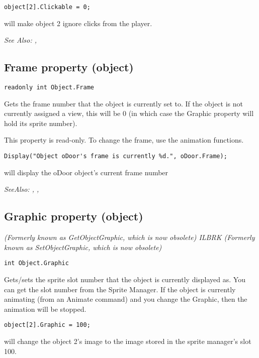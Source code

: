 \begin{verbatim}
object[2].Clickable = 0;
\end{verbatim}
will make object 2 ignore clicks from the player.

\it{See Also:} ,


\subsection{Frame property (object)}\label{Object.Frame}%

\begin{verbatim}
readonly int Object.Frame
\end{verbatim}
Gets the frame number that the object is currently set to. If the object is not currently
assigned a view, this will be 0 (in which case the Graphic property will
hold its sprite number).

This property is read-only. To change the frame, use the animation functions.

\begin{verbatim}
Display("Object oDoor's frame is currently %d.", oDoor.Frame);
\end{verbatim}
will display the oDoor object's current frame number

\it{SeeAlso:} ,
,


\subsection{Graphic property (object)}\label{Object.Graphic}%

\it{(Formerly known as GetObjectGraphic, which is now obsolete)} ILBRK
\it{(Formerly known as SetObjectGraphic, which is now obsolete)}

\begin{verbatim}
int Object.Graphic
\end{verbatim}
Gets/sets the sprite slot number that the object is currently displayed as.
You can get the slot number from the Sprite Manager. If the object is
currently animating (from an Animate command) and you change the Graphic, then the
animation will be stopped.

\begin{verbatim}
object[2].Graphic = 100;
\end{verbatim}
will change the object 2's image to the image stored in the sprite manager's slot 100.

